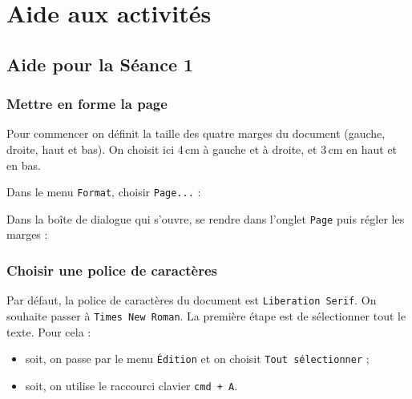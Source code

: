 



\section{Aide aux activités}
\subsection{\label{correction_texte01}Aide pour la Séance 1}

\subsubsection{Mettre en forme la page}

Pour commencer on définit la taille des quatre marges du document (gauche, droite, haut et bas). On choisit ici 4\,cm à gauche et à droite, et 3\,cm en haut et en bas.

Dans le menu \texttt{Format}, choisir \texttt{Page...} :    


Dans la boîte de dialogue qui s'ouvre, se rendre dans l'onglet \texttt{Page} puis régler les marges :  












\subsubsection{Choisir une police de caractères}

Par défaut, la police de caractères du document est \texttt{Liberation Serif}. On souhaite passer à \texttt{Times New Roman}. La première étape est de sélectionner tout le texte. Pour cela :

\begin{itemize}
\item soit, on passe par le menu \texttt{Édition} et on choisit \texttt{Tout sélectionner} ;
\item soit, on utilise le raccourci clavier \texttt{cmd + A}.    
\end{itemize}

